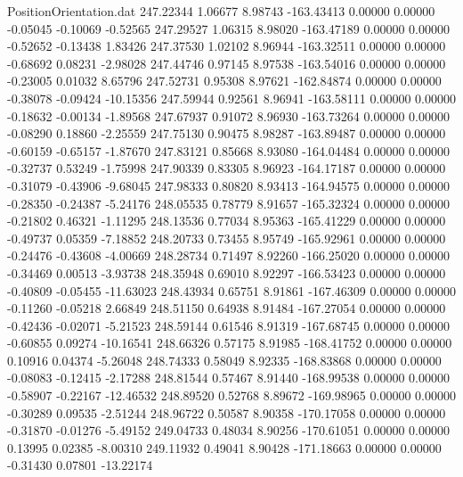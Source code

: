 \begin{filecontents}{PositionOrientation.dat}
 247.22344    1.06677    8.98743  -163.43413    0.00000    0.00000   -0.05045   -0.10069   -0.52565
 247.29527    1.06315    8.98020  -163.47189    0.00000    0.00000   -0.52652   -0.13438    1.83426
 247.37530    1.02102    8.96944  -163.32511    0.00000    0.00000   -0.68692    0.08231   -2.98028
 247.44746    0.97145    8.97538  -163.54016    0.00000    0.00000   -0.23005    0.01032    8.65796
 247.52731    0.95308    8.97621  -162.84874    0.00000    0.00000   -0.38078   -0.09424  -10.15356
 247.59944    0.92561    8.96941  -163.58111    0.00000    0.00000   -0.18632   -0.00134   -1.89568
 247.67937    0.91072    8.96930  -163.73264    0.00000    0.00000   -0.08290    0.18860   -2.25559
 247.75130    0.90475    8.98287  -163.89487    0.00000    0.00000   -0.60159   -0.65157   -1.87670
 247.83121    0.85668    8.93080  -164.04484    0.00000    0.00000   -0.32737    0.53249   -1.75998
 247.90339    0.83305    8.96923  -164.17187    0.00000    0.00000   -0.31079   -0.43906   -9.68045
 247.98333    0.80820    8.93413  -164.94575    0.00000    0.00000   -0.28350   -0.24387   -5.24176
 248.05535    0.78779    8.91657  -165.32324    0.00000    0.00000   -0.21802    0.46321   -1.11295
 248.13536    0.77034    8.95363  -165.41229    0.00000    0.00000   -0.49737    0.05359   -7.18852
 248.20733    0.73455    8.95749  -165.92961    0.00000    0.00000   -0.24476   -0.43608   -4.00669
 248.28734    0.71497    8.92260  -166.25020    0.00000    0.00000   -0.34469    0.00513   -3.93738
 248.35948    0.69010    8.92297  -166.53423    0.00000    0.00000   -0.40809   -0.05455  -11.63023
 248.43934    0.65751    8.91861  -167.46309    0.00000    0.00000   -0.11260   -0.05218    2.66849
 248.51150    0.64938    8.91484  -167.27054    0.00000    0.00000   -0.42436   -0.02071   -5.21523
 248.59144    0.61546    8.91319  -167.68745    0.00000    0.00000   -0.60855    0.09274  -10.16541
 248.66326    0.57175    8.91985  -168.41752    0.00000    0.00000    0.10916    0.04374   -5.26048
 248.74333    0.58049    8.92335  -168.83868    0.00000    0.00000   -0.08083   -0.12415   -2.17288
 248.81544    0.57467    8.91440  -168.99538    0.00000    0.00000   -0.58907   -0.22167  -12.46532
 248.89520    0.52768    8.89672  -169.98965    0.00000    0.00000   -0.30289    0.09535   -2.51244
 248.96722    0.50587    8.90358  -170.17058    0.00000    0.00000   -0.31870   -0.01276   -5.49152
 249.04733    0.48034    8.90256  -170.61051    0.00000    0.00000    0.13995    0.02385   -8.00310
 249.11932    0.49041    8.90428  -171.18663    0.00000    0.00000   -0.31430    0.07801  -13.22174

\end{filecontents}

